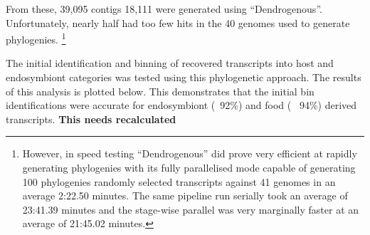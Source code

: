 %

From these, 39,095 contigs 18,111 were generated using ``Dendrogenous''.  Unfortunately, nearly half had too few hits in the 40 genomes used 
to generate phylogenies.  \footnote{However, in speed testing ``Dendrogenous'' did prove very efficient at rapidly generating phylogenies with its
fully parallelised mode capable of generating 100 phylogenies randomly selected transcripts against 41 genomes in an average 2:22.50 minutes.
The same pipeline run serially took an average of 23:41.39 minutes and the stage-wise parallel was very marginally faster at 
an average of 21:45.02 minutes.}



The initial identification and binning of recovered transcripts into host and endosymbiont categories was 
tested using this phylogenetic approach. The results of this analysis is plotted 
below. This demonstrates that the initial bin identifications were accurate for
endosymbiont (~92\%) and food ( ~94\%) derived transcripts. 
\textbf{This needs recalculated}


